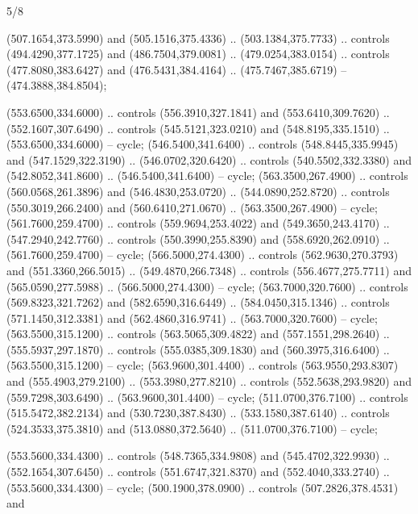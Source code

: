 \begin{flagdescription}{5/8}
\begin{scope}[shift={(0.5\flaglength,0.5\flagwidth)},scale=\flagwidth*\stretchfactor/820]
\begin{scope}[scale=1.84,xshift=-135mm,yshift=84mm]
\begin{scope}[y=0.80pt, x=0.80pt, yscale=-1, xscale=1]
\begin{scope}[cm={{1.01416,0.0,0.0,1.033,(-6.79641,-9.89449)}}]
\begin{scope}[draw=c24420e]
\begin{scope}[line width=0.131\lw]
  (507.1654,373.5990) and (505.1516,375.4336) .. (503.1384,375.7733) .. controls
  (494.4290,377.1725) and (486.7504,379.0081) .. (479.0254,383.0154) .. controls
  (477.8080,383.6427) and (476.5431,384.4164) .. (475.7467,385.6719) --
  (474.3888,384.8504);
\begin{scope}[fill=c406325]
 (553.6500,334.6000) .. controls (556.3910,327.1841) and
  (553.6410,309.7620) .. (552.1607,307.6490) .. controls (545.5121,323.0210) and
  (548.8195,335.1510) .. (553.6500,334.6000) -- cycle;
 (546.5400,341.6400) .. controls (548.8445,335.9945) and
  (547.1529,322.3190) .. (546.0702,320.6420) .. controls (540.5502,332.3380) and
  (542.8052,341.8600) .. (546.5400,341.6400) -- cycle;
 (563.3500,267.4900) .. controls (560.0568,261.3896) and
  (546.4830,253.0720) .. (544.0890,252.8720) .. controls (550.3019,266.2400) and
  (560.6410,271.0670) .. (563.3500,267.4900) -- cycle;
 (561.7600,259.4700) .. controls (559.9694,253.4022) and
  (549.3650,243.4170) .. (547.2940,242.7760) .. controls (550.3990,255.8390) and
  (558.6920,262.0910) .. (561.7600,259.4700) -- cycle;
 (566.5000,274.4300) .. controls (562.9630,270.3793) and
  (551.3360,266.5015) .. (549.4870,266.7348) .. controls (556.4677,275.7711) and
  (565.0590,277.5988) .. (566.5000,274.4300) -- cycle;
 (563.7000,320.7600) .. controls (569.8323,321.7262) and
  (582.6590,316.6449) .. (584.0450,315.1346) .. controls (571.1450,312.3381) and
  (562.4860,316.9741) .. (563.7000,320.7600) -- cycle;
 (563.5500,315.1200) .. controls (563.5065,309.4822) and
  (557.1551,298.2640) .. (555.5937,297.1870) .. controls (555.0385,309.1830) and
  (560.3975,316.6400) .. (563.5500,315.1200) -- cycle;
 (563.9600,301.4400) .. controls (563.9550,293.8307) and
  (555.4903,279.2100) .. (553.3980,277.8210) .. controls (552.5638,293.9820) and
  (559.7298,303.6490) .. (563.9600,301.4400) -- cycle;
 (511.0700,376.7100) .. controls (515.5472,382.2134) and
  (530.7230,387.8430) .. (533.1580,387.6140) .. controls (524.3533,375.3810) and
  (513.0880,372.5640) .. (511.0700,376.7100) -- cycle;
\end{scope}
\begin{scope}[fill=c67923d]
 (553.5600,334.4300) .. controls (548.7365,334.9808) and
  (545.4702,322.9930) .. (552.1654,307.6450) .. controls (551.6747,321.8370) and
  (552.4040,333.2740) .. (553.5600,334.4300) -- cycle;
 (500.1900,378.0900) .. controls (507.2826,378.4531) and

\end{scope}
\end{scope}
\end{scope}
\end{scope}
\end{scope}
\end{scope}
\end{scope}
\end{flagdescription}
